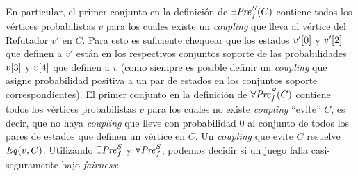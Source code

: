 %
En particular, el primer conjunto en la definición de $\SymbEFairpre(C)$
contiene todos los vértices probabilistas $v$ para los cuales existe un \emph{coupling} que lleva al vértice del Refutador $v'$ en $C$.  Para esto es suficiente chequear que los estados $\pr{0}{v'}$ y $\pr{2}{v'}$ que definen a $v'$
están en los respectivos conjuntos soporte de las probabilidades
$\pr{3}{v}$ y $\pr{4}{v}$ que definen a $v$ (como
siempre es posible definir un \emph{coupling} que asigne probabilidad positiva a un par de estados en los conjuntos soporte correspondientes).  El primer conjunto en la definición de $\SymbAFairpre(C)$ contiene todos los vértices probabilistas $v$ para los cuales no existe \emph{coupling} ``evite'' $C$, es decir, que no haya \emph{coupling} que lleve con probabilidad 0 al conjunto de todos los pares de estados que definen un vértice en $C$.  Un \emph{coupling} que evite
$C$ resuelve $\Eq(v,C)$.
%
Utilizando $\SymbEFairpre$ y $\SymbAFairpre$, podemos decidir si un juego falla casi-seguramente bajo \emph{fairness}:

